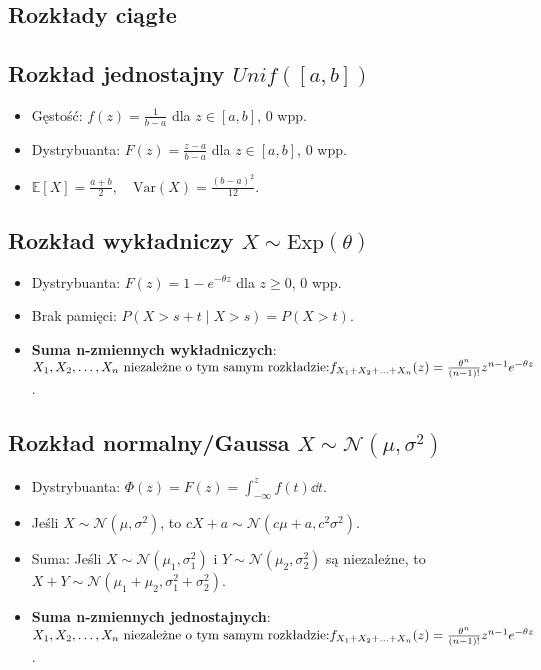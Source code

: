 \documentclass{article}
\theoremstyle{definition}
\theoremstyle{remark}
\begin{document}
\begin{multicols}{2}
    \section*{Rozkłady ciągłe}

    \subsection*{Rozkład jednostajny \(Unif([a, b]) \)}
    \begin{itemize}[itemsep=0pt, left=0pt]
        \item Gęstość: \( f(z) = \frac{1}{b-a} \) dla \( z \in [a, b] \), 0 wpp.
        \item Dystrybuanta: \( F(z) = \frac{z-a}{b-a} \) dla \( z \in [a, b] \), 0 wpp.
        \item \(\mathbb{E}[X] = \frac{a+b}{2}, \quad \text{Var}(X) = \frac{(b-a)^2}{12}\).
    \end{itemize}

    \subsection*{Rozkład wykładniczy \( X \sim \text{Exp}(\theta) \)}
    \begin{itemize}[itemsep=0pt, left=0pt]
        \item Dystrybuanta: \( F(z) = 1 - e^{-\theta z} \) dla \( z \geq 0 \), 0 wpp.
        \item Brak pamięci: \( P(X > s+t \mid X > s) = P(X > t) \). 
          
        \item \textbf{Suma n-zmiennych wykładniczych}: \(X_1, X_2, \ldots, X_n \\
        \text{ niezależne o tym samym rozkładzie:} \\
         f_{X_1 + X_2 + \ldots + X_n}(z) =  \frac{\theta^n}{(n-1)!}z^{n-1}e^{-\theta z}\).
    \end{itemize}

    \subsection*{Rozkład normalny/Gaussa \( X \sim \mathcal{N}(\mu, \sigma^2) \)}
    \begin{itemize}[itemsep=0pt, left=0pt]
        \item Dystrybuanta: \(\Phi(z)=F(z) = \int_{-\infty}^{z} f(t) \dd{t}\).
        \item Jeśli \(X \sim \mathcal{N}(\mu, \sigma^2)\), to \(cX+a \sim \mathcal{N}(c\mu+a, c^2\sigma^2)\).
        \item Suma: Jeśli \( X \sim \mathcal{N}(\mu_1, \sigma_1^2) \) i \( Y \sim \mathcal{N}(\mu_2, \sigma_2^2) \) są niezależne, to \( X+Y \sim \mathcal{N}(\mu_1+\mu_2, \sigma_1^2+\sigma_2^2) \).
        \item \textbf{Suma n-zmiennych jednostajnych}: \(X_1, X_2, \ldots, X_n \\
        \text{ niezależne o tym samym rozkładzie:} \\
         f_{X_1 + X_2 + \ldots + X_n}(z) =  \frac{\theta^n}{(n-1)!}z^{n-1}e^{-\theta z}\).
    \end{itemize}


\end{multicols}
\end{document}
